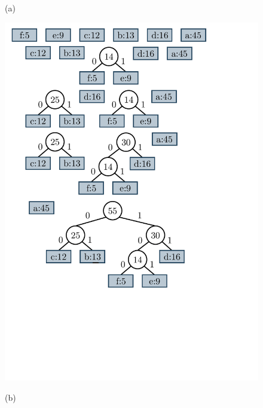 \begin{figure}
\begin{minipage}{1\textwidth}
\begin{minipage}{0.45\textwidth}
    			(a)
    		\end{minipage}
    		\begin{minipage}{0.45\textwidth}
    			\centering
    			\includegraphics[scale=.45, clip, trim=40 690 150 50]{img/graphs-huffman21.pdf}

    			(b)
    		\end{minipage}  		
    	\end{minipage}
    	

\end{figure}
